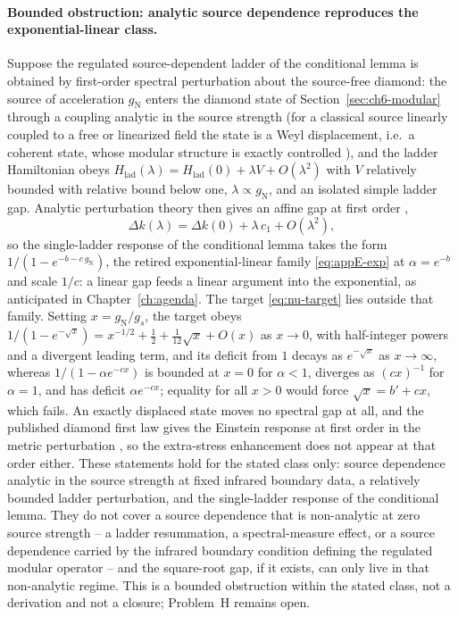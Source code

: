 \paragraph{Bounded obstruction: analytic source dependence reproduces the exponential-linear class.}
Suppose the regulated source-dependent ladder of the conditional lemma is obtained
by first-order spectral perturbation about the source-free diamond: the source of
acceleration \(g_{\mathrm N}\) enters the diamond state of Section~\ref{sec:ch6-modular}
through a coupling analytic in the source strength (for a classical source linearly
coupled to a free or linearized field the state is a Weyl displacement, i.e.\ a
coherent state, whose modular structure is exactly controlled \cite{Longo2022Weyl}),
and the ladder Hamiltonian obeys
\(H_{\mathrm{lad}}(\lambda)=H_{\mathrm{lad}}(0)+\lambda V+O(\lambda^{2})\)
with \(V\) relatively bounded with relative bound below one, \(\lambda\propto g_{\mathrm N}\),
and an isolated simple ladder gap. Analytic perturbation theory then gives an affine
gap at first order \cite{Kato1966},
\[
\Delta k(\lambda)=\Delta k(0)+\lambda\,c_{1}+O(\lambda^{2}),
\]
so the single-ladder response of the conditional lemma takes the form
\(1/(1-e^{-b-c\,g_{\mathrm N}})\), the retired exponential-linear family
\eqref{eq:appE-exp} at \(\alpha=e^{-b}\) and scale \(1/c\): a linear gap feeds a
linear argument into the exponential, as anticipated in Chapter~\ref{ch:agenda}.
The target \eqref{eq:nu-target} lies outside that family. Setting
\(x=g_{\mathrm N}/g_s\), the target obeys
\(1/(1-e^{-\sqrt{x}})=x^{-1/2}+\tfrac12+\tfrac{1}{12}\sqrt{x}+O(x)\) as \(x\to0\),
with half-integer powers and a divergent leading term, and its deficit from \(1\)
decays as \(e^{-\sqrt{x}}\) as \(x\to\infty\), whereas \(1/(1-\alpha e^{-c x})\) is
bounded at \(x=0\) for \(\alpha<1\), diverges as \((c x)^{-1}\) for \(\alpha=1\), and
has deficit \(\alpha e^{-c x}\); equality for all \(x>0\) would force
\(\sqrt{x}=b'+c x\), which fails. An exactly displaced state moves no spectral gap at
all, and the published diamond first law gives the Einstein response at first order in
the metric perturbation \cite{Jacobson2016,JacobsonVisser2019}, so the extra-stress
enhancement does not appear at that order either. These statements hold for the stated
class only: source dependence analytic in the source strength at fixed infrared
boundary data, a relatively bounded ladder perturbation, and the single-ladder
response of the conditional lemma. They do not cover a source dependence that is
non-analytic at zero source strength -- a ladder resummation, a spectral-measure
effect, or a source dependence carried by the infrared boundary condition defining
the regulated modular operator -- and the square-root gap, if it exists, can only
live in that non-analytic regime. This is a bounded obstruction within the stated
class, not a derivation and not a closure; Problem~H remains open.

